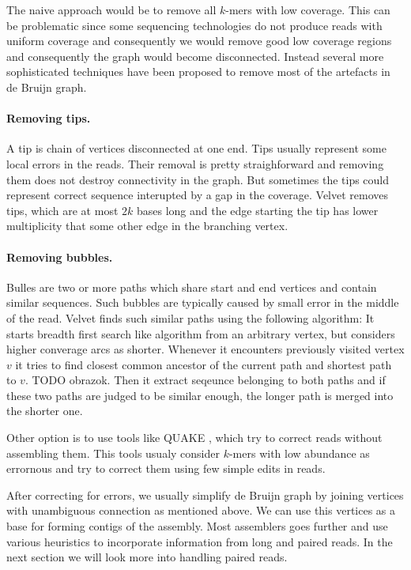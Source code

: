 The naive approach would be to remove all $k$-mers with low coverage.
This can be problematic since some sequencing technologies do not produce reads with uniform coverage
and consequently we would remove good low coverage regions and consequently the graph would become disconnected.
Instead several more sophisticated techniques have been proposed to remove
most of the artefacts in de Bruijn graph.

\paragraph{Removing tips.} A tip is chain of vertices disconnected at one end. 
Tips usually represent some local errors in the reads. Their removal is pretty straighforward
and removing them does not destroy connectivity in the graph. But sometimes the tips
could represent correct sequence interupted by a gap in the coverage.
Velvet \citep{Velvet} removes tips, which are at most $2k$ bases long and the edge starting
the tip has lower multiplicity that some other edge in the branching vertex.

\paragraph{Removing bubbles.} Bulles are two or more paths which share start and end vertices
and contain similar sequences.
Such bubbles are typically caused by small error in the middle of the read.
Velvet finds such similar paths using the following algorithm:
It starts breadth first search like algorithm from an arbitrary vertex, but considers higher converage
arcs as shorter. Whenever it encounters previously visited vertex $v$ it tries to find closest common ancestor
of the current path and shortest path to $v$. TODO obrazok. Then it extract seqeunce belonging to both paths and
if these two paths are judged to be similar enough, the longer path is merged into the shorter one. 
 
\bigskip

Other option is to use tools like QUAKE \citep{Quake}, which try to correct reads
without assembling them. This tools usualy consider $k$-mers with low abundance
as errornous and try to correct them using few simple edits in reads.

After correcting for errors, we usually simplify de Bruijn graph by joining vertices
with unambiguous connection as mentioned above. 
We can use this vertices as a base for forming contigs of the assembly.
Most assemblers goes further and use various heuristics
to incorporate information from long and paired reads.
In the next section we will look more into handling paired reads.

